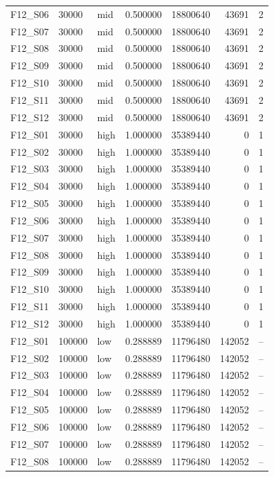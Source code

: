 \begin{longtable}{lllr r r r}
F12\_S06 & 30000 & mid & 0.500000 & 18800640 & 43691 & 2 \\
F12\_S07 & 30000 & mid & 0.500000 & 18800640 & 43691 & 2 \\
F12\_S08 & 30000 & mid & 0.500000 & 18800640 & 43691 & 2 \\
F12\_S09 & 30000 & mid & 0.500000 & 18800640 & 43691 & 2 \\
F12\_S10 & 30000 & mid & 0.500000 & 18800640 & 43691 & 2 \\
F12\_S11 & 30000 & mid & 0.500000 & 18800640 & 43691 & 2 \\
F12\_S12 & 30000 & mid & 0.500000 & 18800640 & 43691 & 2 \\
F12\_S01 & 30000 & high & 1.000000 & 35389440 & 0 & 1 \\
F12\_S02 & 30000 & high & 1.000000 & 35389440 & 0 & 1 \\
F12\_S03 & 30000 & high & 1.000000 & 35389440 & 0 & 1 \\
F12\_S04 & 30000 & high & 1.000000 & 35389440 & 0 & 1 \\
F12\_S05 & 30000 & high & 1.000000 & 35389440 & 0 & 1 \\
F12\_S06 & 30000 & high & 1.000000 & 35389440 & 0 & 1 \\
F12\_S07 & 30000 & high & 1.000000 & 35389440 & 0 & 1 \\
F12\_S08 & 30000 & high & 1.000000 & 35389440 & 0 & 1 \\
F12\_S09 & 30000 & high & 1.000000 & 35389440 & 0 & 1 \\
F12\_S10 & 30000 & high & 1.000000 & 35389440 & 0 & 1 \\
F12\_S11 & 30000 & high & 1.000000 & 35389440 & 0 & 1 \\
F12\_S12 & 30000 & high & 1.000000 & 35389440 & 0 & 1 \\
F12\_S01 & 100000 & low & 0.288889 & 11796480 & 142052 & -- \\
F12\_S02 & 100000 & low & 0.288889 & 11796480 & 142052 & -- \\
F12\_S03 & 100000 & low & 0.288889 & 11796480 & 142052 & -- \\
F12\_S04 & 100000 & low & 0.288889 & 11796480 & 142052 & -- \\
F12\_S05 & 100000 & low & 0.288889 & 11796480 & 142052 & -- \\
F12\_S06 & 100000 & low & 0.288889 & 11796480 & 142052 & -- \\
F12\_S07 & 100000 & low & 0.288889 & 11796480 & 142052 & -- \\
F12\_S08 & 100000 & low & 0.288889 & 11796480 & 142052 & -- \\

\end{longtable}
